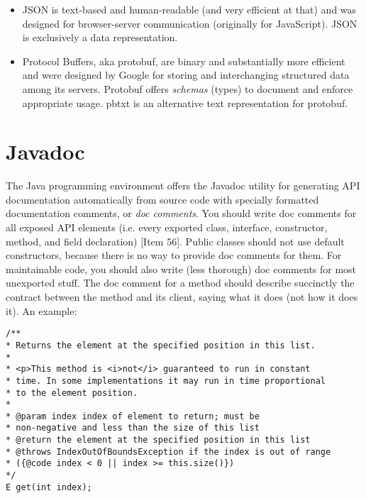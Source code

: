 \documentclass[8pt, table, xcdraw]{article}%
\begin{document}
\begin{itemize}
    \item JSON is text-based and human-readable (and very efficient at that) and was designed for browser-server communication (originally for JavaScript). JSON is exclusively a data representation.
    \item Protocol Buffers, aka protobuf, are binary and substantially more efficient and were designed by Google for storing and interchanging structured data among its servers. Protobuf offers \emph{schemas} (types) to document and enforce appropriate usage. pbtxt is an alternative text representation for protobuf.
\end{itemize}

\section{Javadoc}

The Java programming environment offers the Javadoc utility for generating API documentation automatically from source code with specially formatted documentation comments, or \emph{doc comments}. You should write doc comments for all exposed API elements (i.e. every exported class, interface, constructor, method, and field declaration) [Item 56]. Public classes should not use default constructors, because there is no way to provide doc comments for them. For maintainable code, you should also write (less thorough) doc comments for most unexported stuff. The doc comment for a method should describe succinctly the contract between the method and its client, saying what it does (not how it does it). An example:

\begin{lstlisting}
/**
* Returns the element at the specified position in this list.
*
* <p>This method is <i>not</i> guaranteed to run in constant
* time. In some implementations it may run in time proportional
* to the element position.
*
* @param index index of element to return; must be
* non-negative and less than the size of this list
* @return the element at the specified position in this list
* @throws IndexOutOfBoundsException if the index is out of range
* ({@code index < 0 || index >= this.size()})
*/
E get(int index);
\end{lstlisting}
\end{document}

